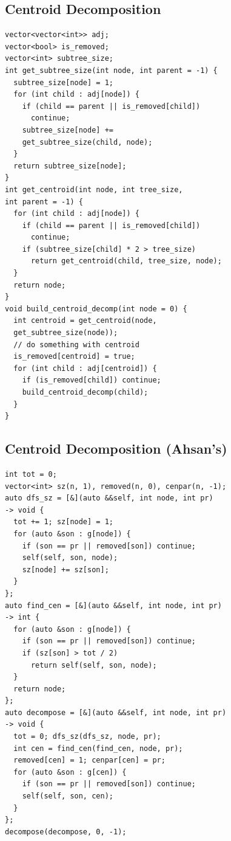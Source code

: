\subsection{Centroid Decomposition}
\begin{verbatim}
vector<vector<int>> adj;
vector<bool> is_removed;
vector<int> subtree_size;
int get_subtree_size(int node, int parent = -1) {
  subtree_size[node] = 1;
  for (int child : adj[node]) {
    if (child == parent || is_removed[child])
      continue;
    subtree_size[node] +=
    get_subtree_size(child, node);
  }
  return subtree_size[node];
}
int get_centroid(int node, int tree_size,
int parent = -1) {
  for (int child : adj[node]) {
    if (child == parent || is_removed[child])
      continue;
    if (subtree_size[child] * 2 > tree_size)
      return get_centroid(child, tree_size, node);
  }
  return node;
}
void build_centroid_decomp(int node = 0) {
  int centroid = get_centroid(node,
  get_subtree_size(node));
  // do something with centroid
  is_removed[centroid] = true;
  for (int child : adj[centroid]) {
    if (is_removed[child]) continue;
    build_centroid_decomp(child);
  }
}
\end{verbatim}
\subsection{Centroid Decomposition (Ahsan's)}
\begin{verbatim}
int tot = 0;
vector<int> sz(n, 1), removed(n, 0), cenpar(n, -1);
auto dfs_sz = [&](auto &&self, int node, int pr)
-> void {
  tot += 1; sz[node] = 1;
  for (auto &son : g[node]) {
    if (son == pr || removed[son]) continue;
    self(self, son, node);
    sz[node] += sz[son];
  }
};
auto find_cen = [&](auto &&self, int node, int pr)
-> int {
  for (auto &son : g[node]) {
    if (son == pr || removed[son]) continue;
    if (sz[son] > tot / 2)
      return self(self, son, node);
  }
  return node;
};
auto decompose = [&](auto &&self, int node, int pr)
-> void {
  tot = 0; dfs_sz(dfs_sz, node, pr);
  int cen = find_cen(find_cen, node, pr);
  removed[cen] = 1; cenpar[cen] = pr;
  for (auto &son : g[cen]) {
    if (son == pr || removed[son]) continue;
    self(self, son, cen);
  }
};
decompose(decompose, 0, -1);
\end{verbatim}
